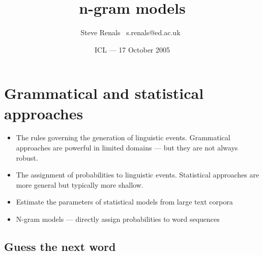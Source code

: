 \usepackage{amsmath}
\usepackage{color}
\title{n-gram models}
\author{Steve Renals \newline \mbox{ }s.renals@ed.ac.uk\mbox{ }}
\date{ICL --- 17 October 2005}



\frame{\titlepage}




\frame{\tableofcontents}


\section{Grammatical and statistical approaches}

\begin{frame}
  \begin{itemize}
  \item  \alert{The rules governing the generation of linguistic
      events.} Grammatical approaches are powerful in limited domains --- but
    they are not always robust.  
  \item \alert{The assignment of probabilities to linguistic
      events.}  Statistical approaches are more general but typically more
    shallow.  
  \item Estimate the parameters of statistical models from large text
    corpora 
  \item N-gram models --- directly assign probabilities to word
    sequences 
  \end{itemize}
\end{frame}

\subsection{Guess the next word}

